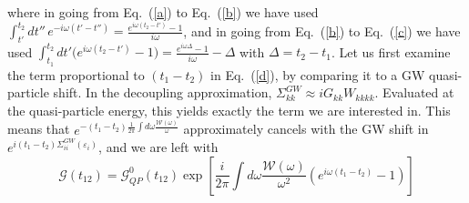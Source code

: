 where in going from Eq.~(\ref{a}) to Eq.~(\ref{b}) we have used $\int_{t'}^{t_2} dt'' \, e^{-i\omega(t'-t'')}  = \frac{e^{i\omega (t_2-t')} - 1}{i\omega}$, and in going from Eq.~(\ref{b}) to Eq.~(\ref{c}) we have used $\int_{t_1}^{t_2} dt' \big(e^{i\omega(t_2-t')} - 1\big)
= \frac{e^{i\omega \Delta}-1}{i\omega} - \Delta$ with $\Delta = t_2-t_1$.
Let us first examine the term proportional to $\left(t_{1}-t_{2}\right)$ in Eq.~(\ref{d}), by comparing it to a GW quasi-particle shift. In the decoupling approximation, $\Sigma_{k k}^{G W} \approx i G_{k k} W_{k k k k}$. Evaluated at the quasi-particle energy, this yields exactly the term we are interested in. This means that $e^{-\left(t_{1}-t_{2}\right) \frac{1}{2 \pi} \int d \omega \frac{\mathcal{W}(\omega)}{\omega}}$ approximately cancels with the GW shift in $e^{i\left(t_{1}-t_{2}\right) \Sigma_{i i}^{G W}\left(\varepsilon_{i}\right)}$, and we are left with
\begin{equation*}
\mathcal{G}\left(t_{12}\right)=\mathcal{G}_{Q P}^{0}\left(t_{12}\right) \exp \left[\frac{i}{2 \pi} \int d \omega \frac{\mathcal{W}(\omega)}{\omega^{2}}\left(e^{i \omega\left(t_{1}-t_{2}\right)}-1\right)\right] \tag{17}
\end{equation*}


